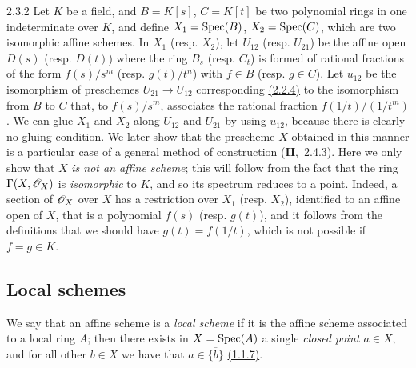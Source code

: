 \begin{env}[Example]{2.3.2}
\label{exm-1.2.3.2}
Let $K$ be a field, and $B=K[s]$, $C=K[t]$ be two polynomial rings in one indeterminate over
$K$, and define $X_1={\mathop{\mathrm{Spec}}\nolimits}(B)$, $X_2={\mathop{\mathrm{Spec}}\nolimits}(C)$, which are two isomorphic affine schemes. In
$X_1$ (resp. $X_2$), let $U_{12}$ (resp. $U_{21}$) be the affine open $D(s)$ (resp. $D(t)$)
where the ring $B_s$ (resp. $C_t$) is formed of rational fractions of the form $f(s)/s^m$
(resp. $g(t)/t^n$) with $f\in B$ (resp. $g\in C$). Let $u_{12}$ be the isomorphism of
preschemes $U_{21}\to U_{12}$ corresponding \hyperref[prop-1.2.2.4]{(2.2.4)} to the isomorphism from $B$ to
$C$ that, to $f(s)/s^m$, associates the rational fraction $f(1/t)/(1/t^m)$. We can glue $X_1$
and $X_2$ along $U_{12}$ and $U_{21}$ by using $u_{12}$, because there is clearly no gluing
condition. We later show that the prescheme $X$ obtained in this manner is a particular case
of a general method of construction (\textbf{II},~2.4.3). Here we only show that $X$ {\it is
not an affine scheme}; this will follow from the fact that the ring $\Gamma(X,\mathscr{O}_X)$ is
{\it isomorphic} to $K$, and so its spectrum reduces to a point. Indeed, a section of
$\mathscr{O}_X$ over $X$ has a restriction over $X_1$ (resp. $X_2$), identified to an affine open of
$X$, that is a polynomial $f(s)$ (resp. $g(t)$), and it follows from the definitions that we
should have $g(t)=f(1/t)$, which is not possible if $f=g\in K$.
\end{env}

\subsection{Local schemes}
\label{subsection-local-schemes}

\begin{env}[2.4.1]
\label{env-1.2.4.1}
We say that an affine scheme is a {\it local scheme} if
it is the affine scheme associated to a local ring $A$; then there exists in
$X={\mathop{\mathrm{Spec}}\nolimits}(A)$ a single {\it closed point $a\in X$}, and for all other $b\in X$
we have that $a\in\overline{\{b\}}$ \hyperref[cor-1.1.1.7]{(1.1.7)}.
\end{env}

